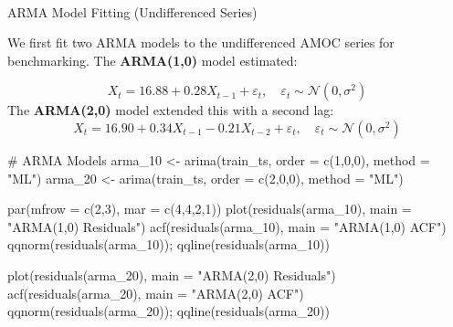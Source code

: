 \documentclass[
  11pt,
]{article}
\makeatletter
\let\oldparagraph\paragraph
\renewcommand{\paragraph}{
    \@ifstar
      \xxxParagraphStar
      \xxxParagraphNoStar
  }
\newcommand{\xxxParagraphStar}[1]{\oldparagraph*{#1}\mbox{}}
\newcommand{\xxxParagraphNoStar}[1]{\oldparagraph{#1}\mbox{}}
\newenvironment{Shaded}{\begin{snugshade}}{\end{snugshade}}
\newcommand{\AttributeTok}[1]{\textcolor[rgb]{0.40,0.45,0.13}{#1}}
\newcommand{\CommentTok}[1]{\textcolor[rgb]{0.37,0.37,0.37}{#1}}
\newcommand{\DecValTok}[1]{\textcolor[rgb]{0.68,0.00,0.00}{#1}}
\newcommand{\FunctionTok}[1]{\textcolor[rgb]{0.28,0.35,0.67}{#1}}
\newcommand{\NormalTok}[1]{\textcolor[rgb]{0.00,0.23,0.31}{#1}}
\newcommand{\OtherTok}[1]{\textcolor[rgb]{0.00,0.23,0.31}{#1}}
\newcommand{\StringTok}[1]{\textcolor[rgb]{0.13,0.47,0.30}{#1}}
\makeatother
\begin{document}
\paragraph{ARMA Model Fitting (Undifferenced
Series)}\label{arma-model-fitting-undifferenced-series}

We first fit two ARMA models to the undifferenced AMOC series for
benchmarking. The \textbf{ARMA(1,0)} model estimated:

\[
X_t = 16.88 + 0.28 X_{t-1} + \varepsilon_t, \quad \varepsilon_t \sim \mathcal{N}(0, \sigma^2)
\] The \textbf{ARMA(2,0)} model extended this with a second lag: \[
X_t = 16.90 + 0.34 X_{t-1} - 0.21 X_{t-2} + \varepsilon_t, \quad \varepsilon_t \sim \mathcal{N}(0, \sigma^2)
\]

\begin{Shaded}
\begin{Highlighting}[]
\CommentTok{\# ARMA Models}
\NormalTok{arma\_10 }\OtherTok{\textless{}{-}} \FunctionTok{arima}\NormalTok{(train\_ts, }\AttributeTok{order =} \FunctionTok{c}\NormalTok{(}\DecValTok{1}\NormalTok{,}\DecValTok{0}\NormalTok{,}\DecValTok{0}\NormalTok{), }\AttributeTok{method =} \StringTok{"ML"}\NormalTok{)}
\NormalTok{arma\_20 }\OtherTok{\textless{}{-}} \FunctionTok{arima}\NormalTok{(train\_ts, }\AttributeTok{order =} \FunctionTok{c}\NormalTok{(}\DecValTok{2}\NormalTok{,}\DecValTok{0}\NormalTok{,}\DecValTok{0}\NormalTok{), }\AttributeTok{method =} \StringTok{"ML"}\NormalTok{)}
\end{Highlighting}
\end{Shaded}

\begin{Shaded}
\begin{Highlighting}[]
\FunctionTok{par}\NormalTok{(}\AttributeTok{mfrow =} \FunctionTok{c}\NormalTok{(}\DecValTok{2}\NormalTok{,}\DecValTok{3}\NormalTok{), }\AttributeTok{mar =} \FunctionTok{c}\NormalTok{(}\DecValTok{4}\NormalTok{,}\DecValTok{4}\NormalTok{,}\DecValTok{2}\NormalTok{,}\DecValTok{1}\NormalTok{))}
\FunctionTok{plot}\NormalTok{(}\FunctionTok{residuals}\NormalTok{(arma\_10), }\AttributeTok{main =} \StringTok{"ARMA(1,0) Residuals"}\NormalTok{)}
\FunctionTok{acf}\NormalTok{(}\FunctionTok{residuals}\NormalTok{(arma\_10), }\AttributeTok{main =} \StringTok{"ARMA(1,0) ACF"}\NormalTok{)}
\FunctionTok{qqnorm}\NormalTok{(}\FunctionTok{residuals}\NormalTok{(arma\_10)); }\FunctionTok{qqline}\NormalTok{(}\FunctionTok{residuals}\NormalTok{(arma\_10))}

\FunctionTok{plot}\NormalTok{(}\FunctionTok{residuals}\NormalTok{(arma\_20), }\AttributeTok{main =} \StringTok{"ARMA(2,0) Residuals"}\NormalTok{)}
\FunctionTok{acf}\NormalTok{(}\FunctionTok{residuals}\NormalTok{(arma\_20), }\AttributeTok{main =} \StringTok{"ARMA(2,0) ACF"}\NormalTok{)}
\FunctionTok{qqnorm}\NormalTok{(}\FunctionTok{residuals}\NormalTok{(arma\_20)); }\FunctionTok{qqline}\NormalTok{(}\FunctionTok{residuals}\NormalTok{(arma\_20))}
\end{Highlighting}
\end{Shaded}
\end{document}
